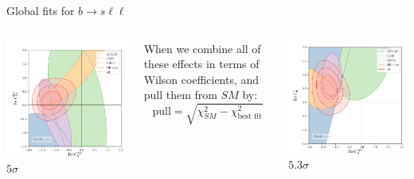 \documentclass[9pt,usenames,dvipsnames]{beamer}
\begin{document}
\begin{frame}{Global fits for $ b \to s \ell \ell$}
	\begin{columns}[c]
		\begin{center}
			\includegraphics[width=0.9 \textwidth]{./assets/c9_c10}\\ $5\sigma$
		\end{center}
		When we combine all of these effects in terms of Wilson coefficients, and pull them from $SM$ by:
		\[\text{pull} = \sqrt{\chi_{SM}^2-\chi_{\text{best fit}}^2}  \] 
		\begin{center}
			\includegraphics[width= \textwidth]{./assets/c9_c9} \\ $5.3\sigma$
		\end{center}	
	\end{columns}
\end{frame}
\end{document}
